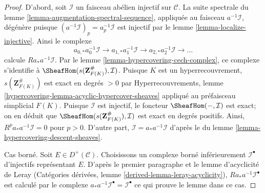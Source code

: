 \begin{proof}
D'abord, soit $\mathcal{I}$ un faisceau abélien injectif sur $\mathcal{C}$.
La suite spectrale du lemme
\ref{lemma-augmentation-spectral-sequence},
appliquée au faisceau $a^{-1}\mathcal{I}$, dégénère puisque
$(a^{-1}\mathcal{I})_p = a_p^{-1}\mathcal{I}$
est injectif par le lemme \ref{lemma-localize-injective}.
Ainsi le complexe
$$
a_{0, *}a_0^{-1}\mathcal{I} \to
a_{1, *}a_1^{-1}\mathcal{I} \to
a_{2, *}a_2^{-1}\mathcal{I} \to\ldots
$$
calcule $Ra_*a^{-1}\mathcal{I}$. Par
le lemme \ref{lemma-hypercovering-cech-complex},
ce complexe s'identifie à
$\SheafHom(s(\mathbf{Z}_{F(K)}^\#), \mathcal{I})$.
Puisque $K$ est un hyperrecouvrement,
$s(\mathbf{Z}_{F(K)}^\#)$ est exact en degrés $> 0$ par
Hyperrecouvrements, lemme \ref{hypercovering-lemma-acyclic-hypercover-sheaves}
appliqué au préfaisceau simplicial $F(K)$.
Puisque $\mathcal{I}$ est injectif, le foncteur $\SheafHom(-, \mathcal{I})$
est exact; on en déduit que
$\SheafHom(s(\mathbf{Z}_{F(K)}^\#), \mathcal{I})$
est exact en degrés positifs. Ainsi,
$R^pa_*a^{-1}\mathcal{I} = 0$ pour $p > 0$.
D'autre part, $\mathcal{I} = a_*a^{-1}\mathcal{I}$ d'après le
du lemme \ref{lemma-hypercovering-descent-sheaves}.

\medskip\noindent
Cas borné. Soit $E \in D^+(\mathcal{C})$.
Choisissons un complexe borné inférieurement $\mathcal{I}^\bullet$ d'injectifs
représentant $E$. D'après le premier paragraphe et le
lemme d'acyclicité de Leray
(Catégories dérivées, lemme \ref{derived-lemma-leray-acyclicity}),
$Ra_*a^{-1}\mathcal{I}^\bullet$
est calculé par le complexe
$a_*a^{-1}\mathcal{I}^\bullet = \mathcal{I}^\bullet$
ce qui prouve le lemme dans ce cas.


\end{proof}
